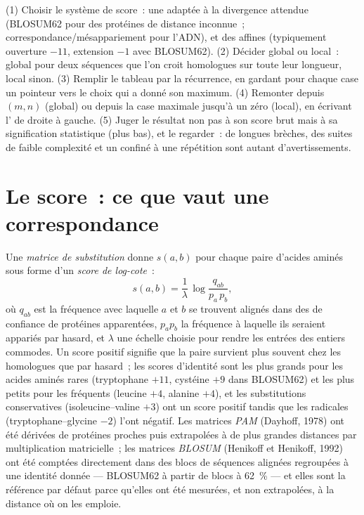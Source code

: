 \begin{method}\label{met:b3:bioinformatics:align}
(1) Choisir le système de score~: une  adaptée à
la divergence attendue (BLOSUM62 pour des protéines de distance
inconnue~; correspondance/mésappariement pour l'ADN), et des  affines (typiquement ouverture $-11$, extension $-1$ avec
BLOSUM62). (2) Décider global ou local~: global pour deux séquences que
l'on croit homologues sur toute leur longueur, local sinon. (3) Remplir
le tableau par la récurrence, en gardant pour chaque case un pointeur
vers le choix qui a donné son maximum. (4) Remonter depuis $(m,n)$
(global) ou depuis la case maximale jusqu'à un zéro (local), en écrivant
l' de droite à gauche. (5) Juger le résultat non pas à son
score brut mais à sa signification statistique (plus bas), et le
regarder~: de longues brèches, des suites de faible complexité et un
 confiné à une répétition sont autant d'avertissements.
\end{method}

\section{Le score~: ce que vaut une correspondance}

\begin{definition}\label{def:b3:bioinformatics:matrices}
Une \emph{matrice de substitution} donne $s(a,b)$ pour chaque paire
d'acides aminés sous forme d'un \emph{score de log-cote}~:
\[
s(a,b) = \frac{1}{\lambda}\,\log\frac{q_{ab}}{p_{a}\,p_{b}},
\]
où $q_{ab}$ est la fréquence avec laquelle $a$ et $b$ se trouvent
alignés dans des  de confiance de protéines apparentées,
$p_{a} p_{b}$ la fréquence à laquelle ils seraient appariés par hasard,
et $\lambda$ une échelle choisie pour rendre les entrées des entiers
commodes. Un score positif signifie que la paire survient plus souvent
chez les homologues que par hasard~; les scores d'identité sont les
plus grands pour les acides aminés rares (tryptophane $+11$, cystéine
$+9$ dans BLOSUM62) et les plus petits pour les fréquents (leucine
$+4$, alanine $+4$), et les substitutions conservatives
(isoleucine--valine $+3$) ont un score positif tandis que les radicales
(tryptophane--glycine $-2$) l'ont négatif. Les matrices \emph{PAM}
(Dayhoff, 1978) ont été dérivées de protéines proches puis extrapolées
à de plus grandes distances par multiplication matricielle~; les
matrices \emph{BLOSUM} (Henikoff et Henikoff, 1992) ont été comptées
directement dans des blocs de séquences alignées regroupées à une
identité donnée --- BLOSUM62 à partir de blocs à \qty{62}{\%} --- et
elles sont la référence par défaut parce qu'elles ont été mesurées, et
non extrapolées, à la distance où on les emploie.
\end{definition}

